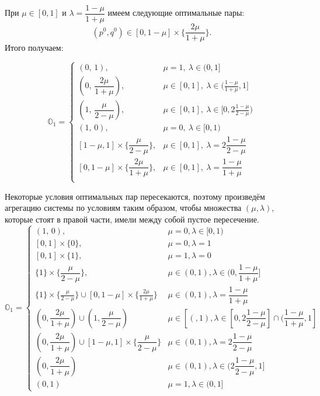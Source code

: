 При $\mu \in [0, 1]$ и $\lambda = \dfrac{1-\mu}{1+\mu}$
имеем следующие оптимальные пары:
$$
	(p^0, q^0) \in [0, 1 - \mu] \times \{\frac{2\mu}{1 + \mu}\}.
$$
Итого получаем:

$$
	\mathbb{O}_1 =
	\begin{cases}
		(0, \, 1), & \mu = 1, \: \lambda \in (0,1] 
		\\
		(0, \, \dfrac{2\mu}{1 + \mu}), & 
		\mu \in [0, 1], \: \lambda \in (\frac{1-\mu}{1+\mu}, 1]
		\\
		(1, \, \dfrac{\mu}{2 - \mu}), & 
		\mu \in [0, 1], \: \lambda \in [0, 2\frac{1-\mu}{2-\mu})
		\\
		(1, \, 0), & \mu=0, \: \lambda \in [0, 1)
		\\
		[1 - \mu, 1] \times  \Big\{ \dfrac{\mu}{2 - \mu}\Big\}, &
		\mu \in [0, 1], \: \lambda = 2\dfrac{1 - \mu}{2 - \mu}	
		\\
		[0, 1 - \mu] \times \Big\{\dfrac{2\mu}{1 + \mu}\Big\}, &
		\mu \in [0, 1], \: \lambda = \dfrac{1-\mu}{1+\mu}
		\\
	\end{cases}
$$

Некоторые условия оптимальных пар пересекаются, поэтому 
произведём агрегацию системы по условиям таким образом, чтобы
множества $(\mu, \lambda)$, которые стоят в правой части,
имели между собой пустое пересечение.
$$
	\mathbb{O}_1 =
	\begin{cases}
		(1, \, 0), & \mu = 0, \lambda \in [0, 1) 
		\\
		[0, 1] \times \{0\}, & 
		\mu=0, \lambda =1
		\\
		[0, 1] \times \{1\}, &
		\mu = 1, \lambda = 0
		\\
		\{1\} \times \{\dfrac{\mu}{2-\mu}\}, &
		\mu \in (0,1), \lambda \in (0, \dfrac{1 - \mu}{1 + \mu}]
		\\
		\{1\} \times \{\frac{\mu}{2-\mu}\} \cup
		[0,1-\mu] \times \{\frac{2\mu}{1+\mu}\} &
		\mu \in (0,1), \lambda = \dfrac{1-\mu}{1+\mu}
		\\
		(0, \dfrac{2\mu}{1 + \mu}) \cup
		(1, \dfrac{\mu}{2 - \mu}) &
		\mu \in [(, 1), \lambda \in 
		[0, 2\dfrac{1 - \mu}{2 - \mu}] \cap (\dfrac{1 - \mu}{1 + \mu}, 	1]
		\\
		(0, \dfrac{2\mu}{1+\mu}) \cup
		[1 - \mu, 1] \times \{\dfrac{\mu}{2 - \mu}\} &
		\mu \in (0, 1), \lambda = 2\dfrac{1 - \mu}{2 - \mu}
		\\
		(0, \dfrac{2\mu}{1 + \mu}) &
		\mu \in (0, 1), \lambda \in (2\dfrac{1 - \mu}{2 - \mu}, 1]
		\\
		(0, 1) & \mu = 1, \lambda \in (0, 1] 	
	\end{cases}
$$

